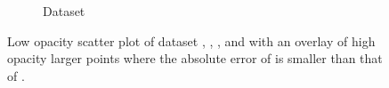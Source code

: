 \begin{figure}
\begin{subfigure}{0.23\textwidth}
			\caption{Dataset \baakmanThree}
			\label{fig:discussion:performance:mbeLowerError:baakman3}
		\end{subfigure}			
		\caption{Low opacity scatter plot of dataset %
			 \ferdosiTwo, %
			 \baakmanTwo, %
			 \ferdosiThree, and %
			 \baakmanThree %
			with an overlay of high opacity larger points where the absolute error of \mbe is smaller than that of \sambe.}
		\label{fig:discussion:performance:multisphere:mbeLowerError}
	\end{figure}		



